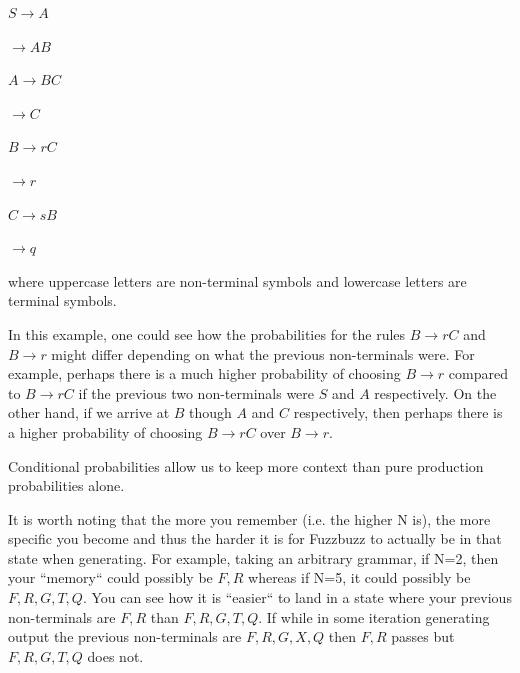 \begin{center}
$S \rightarrow A$
\end{center}
\begin{center}
$\rightarrow A B$
\end{center}

\begin{center}
$A \rightarrow B C$
\end{center}
\begin{center}
$\rightarrow C$
\end{center}

\begin{center}
$B \rightarrow r C$
\end{center}
\begin{center}
$\rightarrow r$
\end{center}

\begin{center}
$C \rightarrow s B$
\end{center}
\begin{center}
$\rightarrow q$
\end{center}

where uppercase letters are non-terminal symbols and lowercase letters are
terminal symbols.


In this example, one could see how the probabilities for the rules $B
\rightarrow rC$ and $B \rightarrow r$ might differ depending on what the
previous non-terminals were. For example, perhaps there is a much higher
probability of choosing $B \rightarrow r$ compared to $B \rightarrow rC$ if the
previous two non-terminals were $S$ and $A$ respectively. On the other hand, if
we arrive at $B$ though $A$ and $C$ respectively, then perhaps there is a
higher probability of choosing $B \rightarrow rC$ over $B \rightarrow r$.

Conditional probabilities allow us to keep more context than pure production
probabilities alone.

It is worth noting that the more you remember (i.e. the higher N is), the more
specific you become and thus the harder it is for Fuzzbuzz to actually be in
that state when generating. For example, taking an arbitrary grammar, if N=2,
then your ``memory`` could possibly be $F, R$ whereas if N=5, it could possibly
be $F, R, G, T, Q$. You can see how it is ``easier`` to land in a state where
your previous non-terminals are $F, R$ than $F, R, G, T, Q$. If while in some
iteration generating output the previous non-terminals are $F, R, G, X, Q$ then
$F, R$ passes but $F, R, G, T, Q$ does not.

